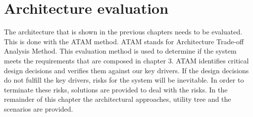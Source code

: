 \section{Architecture evaluation}
The architecture that is shown in the previous chapters needs to be evaluated. This is done with the ATAM method. ATAM stands for Architecture Trade-off Analysis Method. This evaluation method is used to determine if the system meets the requirements that are composed in chapter 3. ATAM identifies critical design decisions and verifies them against our key drivers. If the design decisions do not fulfill the key drivers, risks for the system will be inevitable. In order to terminate these risks, solutions are provided to deal with the risks. In the remainder of this chapter the architectural approaches, utility tree and the scenarios are provided. 



